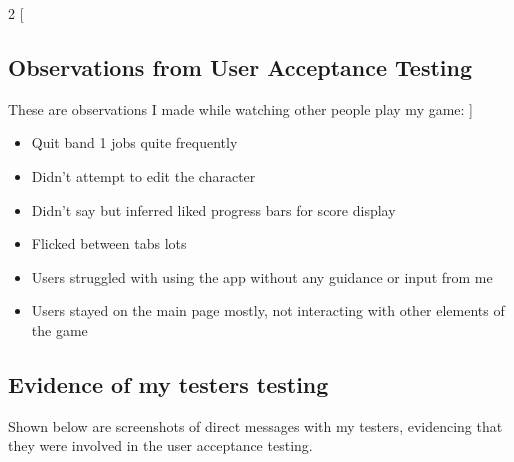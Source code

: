 \begin{multicols}{2}
[
\subsection{Observations from User Acceptance Testing}
These are observations I made while watching other people play my game:
]
\begin{itemize}
    \item Quit band 1 jobs quite frequently
    \item Didn't attempt to edit the character
    \item Didn't say but inferred liked progress bars for score display
    \item Flicked between tabs lots
    \item Users struggled with using the app without any guidance or input from me
    \item Users stayed on the main page mostly, not interacting with other elements of the game
\end{itemize}
\end{multicols}
\subsection{Evidence of my testers testing}
Shown below are screenshots of direct messages with my testers, evidencing that they were involved in the user acceptance testing.

